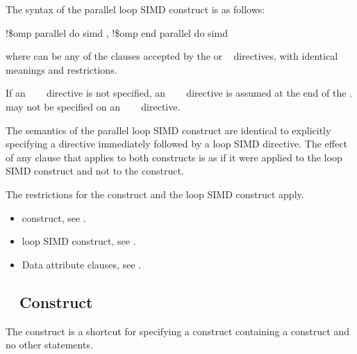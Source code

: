 {{{{\begin{samepage}
\fortranspecificstart
The syntax of the parallel loop SIMD construct is as follows:

\begin{boxedcode}
!\$omp parallel do simd \plc{[clause[ [},\plc{] clause] ... ]}
\plc{[}!\$omp end parallel do simd\plc{]}
\end{boxedcode}
\end{samepage}

where  can be any of the clauses accepted by the 
or ~ directives, with identical meanings and restrictions.

\begin{samepage}
If an ~~~ directive is not specified, an 
~~~ directive is assumed at the end of the 
.  may not be specified on 
an ~~~ directive.
\fortranspecificend
\end{samepage}

\descr
The semantics of the parallel loop SIMD construct are identical to explicitly specifying 
a  directive immediately followed by a loop SIMD directive. The effect of 
any clause that applies to both constructs is as if it were applied to the loop SIMD 
construct and not to the  construct.

\restrictions
The restrictions for the  construct and the loop SIMD construct apply.

\crossreferences
\begin{itemize}
\item {} construct, see 
.

\item loop SIMD construct, see 
.

\item Data attribute clauses, see 
. 
\end{itemize}









\subsection{~ Construct}
\label{subsec:target parallel Construct}
\summary
The   construct is a shortcut for specifying a  
construct containing a  construct and no other statements.

}}}}
